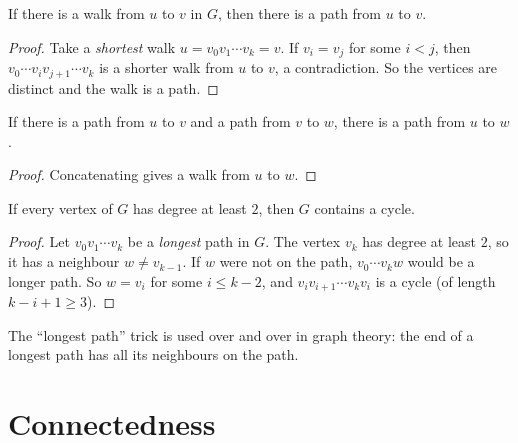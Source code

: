 \begin{theorem}
If there is a walk from $u$ to $v$ in $G$, then there is a path from $u$ to $v$.
\end{theorem}
\begin{proof}
Take a \emph{shortest} walk $u = v_0v_1\cdots v_k = v$. If $v_i = v_j$ for some $i<j$, then
$v_0\cdots v_iv_{j+1}\cdots v_k$ is a shorter walk from $u$ to $v$, a contradiction. So the
vertices are distinct and the walk is a path.
\end{proof}

\begin{corollary}
If there is a path from $u$ to $v$ and a path from $v$ to $w$, there is a path from $u$ to $w$.
\end{corollary}
\begin{proof}
Concatenating gives a walk from $u$ to $w$.
\end{proof}

\begin{theorem}
If every vertex of $G$ has degree at least $2$, then $G$ contains a cycle.
\end{theorem}
\begin{proof}
Let $v_0v_1\cdots v_k$ be a \emph{longest} path in $G$. The vertex $v_k$ has degree at least
$2$, so it has a neighbour $w \neq v_{k-1}$. If $w$ were not on the path, $v_0\cdots v_kw$ would
be a longer path. So $w = v_i$ for some $i \le k-2$, and $v_iv_{i+1}\cdots v_kv_i$ is a cycle
(of length $k - i + 1 \ge 3$).
\end{proof}

The ``longest path'' trick is used over and over in graph theory: the end of a longest path has
all its neighbours on the path.

\begin{center}
\end{center}

\section{Connectedness}

